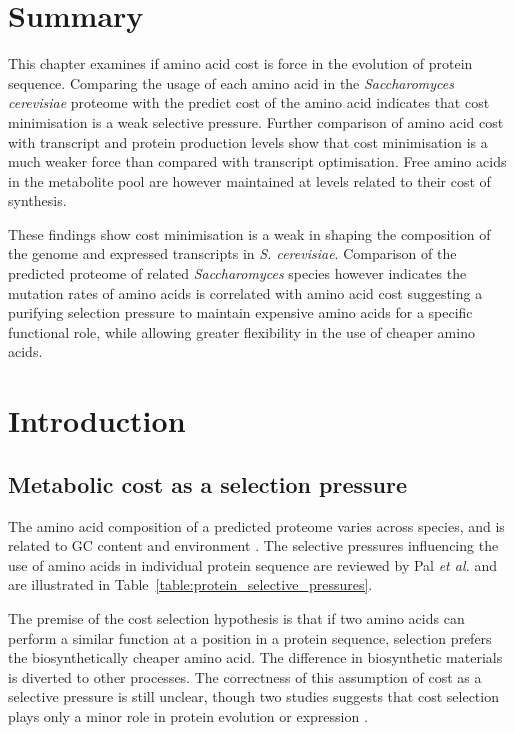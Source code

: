 \section*{Summary}

This chapter examines if amino acid cost is force in the evolution of protein sequence. Comparing the usage of each amino acid in the \emph{Saccharomyces cerevisiae} proteome with the predict cost of the amino acid indicates that cost minimisation is a weak selective pressure. Further comparison of amino acid cost with transcript and protein production levels show that cost minimisation is a much weaker force than compared with transcript optimisation. Free amino acids in the metabolite pool are however maintained at levels related to their cost of synthesis.

These findings show cost minimisation is a weak in shaping the composition of the genome and expressed transcripts in \emph{S. cerevisiae}. Comparison of the predicted proteome of related \emph{Saccharomyces} species however indicates the mutation rates of amino acids is correlated with amino acid cost suggesting a purifying selection pressure to maintain expensive amino acids for a specific functional role, while allowing greater flexibility in the use of cheaper amino acids.

\clearpage

\section{Introduction}

\subsection{Metabolic cost as a selection pressure}

The amino acid composition of a predicted proteome varies across species, and is related to GC content and environment \cite{tekaia2006}. The selective pressures influencing the use of amino acids in individual protein sequence are reviewed by Pal \emph{et al.} \cite{pal2006} and are illustrated in Table~\vref{table:protein_selective_pressures}.

The premise of the cost selection hypothesis \cite{akashi2002} is that if two amino acids can perform a similar function at a position in a protein sequence, selection prefers the biosynthetically cheaper amino acid. The difference in biosynthetic materials is diverted to other processes. The correctness of this assumption of cost as a selective pressure is still unclear, though two studies suggests that cost selection plays only a minor role in protein evolution \cite{rocha2004} or expression \cite{raiford2008}.

